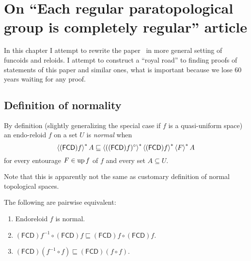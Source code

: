 \chapter{On ``Each regular paratopological group is completely regular'' article}

In this chapter I attempt to rewrite the paper~\cite{2014arXiv1410.1504B} in more general setting of funcoids and reloids.
I attempt to construct a ``royal road'' to finding proofs of statements of this paper and similar ones, what is
important because we lose 60 years waiting for any proof.

\section{Definition of normality}

By definition (slightly generalizing the special case if $f$ is a
quasi-uniform space) an endo-reloid $f$ on a set $U$ is \emph{normal} when
\[ \left\langle (\mathsf{FCD}) f\right\rangle ^{\ast} A \sqsubseteq \left\langle 
((\mathsf{FCD}) f)^{\circ}\right\rangle ^{\ast} \left\langle (\mathsf{FCD})
f \right\rangle ^{\ast} \left\langle F\right\rangle ^{\ast} A \] for every entourage $F \in
\operatorname{up} f$ of $f$ and every set $A \subseteq U$.

Note that this is apparently not the same as customary definition of normal topological spaces.

\begin{thm}
  The following are pairwise equivalent:
  \begin{enumerate}
    \item Endoreloid $f$ is normal.
    
    \item $(\mathsf{FCD}) f^{- 1} \circ (\mathsf{FCD}) f
    \sqsubseteq (\mathsf{FCD}) f \circ (\mathsf{FCD}) f$.
    
    \item $(\mathsf{FCD}) (f^{- 1} \circ f) \sqsubseteq
    (\mathsf{FCD}) (f \circ f)$.
  \end{enumerate}
\end{thm}

